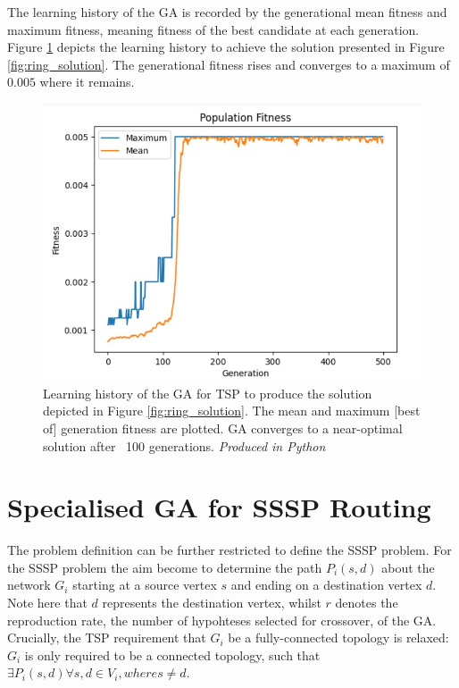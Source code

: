 \documentclass[
	a4paper, %
	10pt, %
	unnumberedsections, %
	twoside, %
]{LTJournalArticle}
\begin{document}
The learning history of the GA is recorded by the generational mean fitness and maximum fitness, meaning fitness of the best candidate at each generation. Figure \ref{fig:tsp_history} depicts the learning history to achieve the solution presented in Figure \ref{fig:ring_solution}. The generational fitness rises and converges to a maximum of \(0.005\) where it remains. \\

\begin{figure}[H]
	\includegraphics[width=\linewidth]{Figures/tsp/history.jpg}
	\caption{Learning history of the GA for TSP to produce the solution depicted in Figure \ref{fig:ring_solution}. The mean and maximum [best of] generation fitness are plotted. GA converges to a near-optimal solution after ~100 generations. \emph{Produced in Python}}
	\label{fig:tsp_history}
\end{figure}

\section{Specialised GA for SSSP Routing}

The problem definition can be further restricted to define the SSSP problem. For the SSSP problem the aim become to determine the path \(P_{i} (s, d)\) about the network \(G_{i}\) starting at a source vertex \(s\) and ending on a destination vertex \(d\). Note here that \(d\) represents the destination vertex, whilst \(r\) denotes the reproduction rate, the number of hypohteses selected for crossover, of the GA. Crucially, the TSP requirement that \(G_{i}\) be a fully-connected topology is relaxed: \(G_{i}\) is only required to be a connected topology, such that \(\exists P_{i}(s, d) \forall s, d \in V_{i}, where s \neq d\). \\
\end{document}
